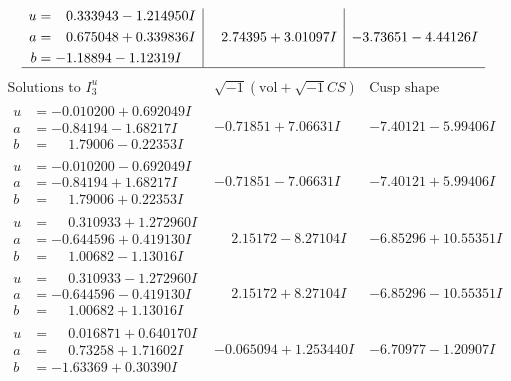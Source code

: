 \documentclass[1p]{elsarticle_modified}
\theoremstyle{definition}
\newcommand{\I}{\sqrt{-1}}
\begin{document}
$$\begin{array}{c|c|c}
\begin{aligned}
u &= \phantom{-}0.333943 - 1.214950 I \\
a &= \phantom{-}0.675048 + 0.339836 I \\
b &= -1.18894 - 1.12319 I\end{aligned}
 & \phantom{-}2.74395 + 3.01097 I & -3.73651 - 4.44126 I\\
 \hline 
 \end{array}$$\newpage$$\begin{array}{c|c|c}  
\text{Solutions to }I^u_{3}& \I (\text{vol} + \sqrt{-1}CS) & \text{Cusp shape}\\
 \hline 
\begin{aligned}
u &= -0.010200 + 0.692049 I \\
a &= -0.84194 - 1.68217 I \\
b &= \phantom{-}1.79006 - 0.22353 I\end{aligned}
 & -0.71851 + 7.06631 I & -7.40121 - 5.99406 I \\ \hline\begin{aligned}
u &= -0.010200 - 0.692049 I \\
a &= -0.84194 + 1.68217 I \\
b &= \phantom{-}1.79006 + 0.22353 I\end{aligned}
 & -0.71851 - 7.06631 I & -7.40121 + 5.99406 I \\ \hline\begin{aligned}
u &= \phantom{-}0.310933 + 1.272960 I \\
a &= -0.644596 + 0.419130 I \\
b &= \phantom{-}1.00682 - 1.13016 I\end{aligned}
 & \phantom{-}2.15172 - 8.27104 I & -6.85296 + 10.55351 I \\ \hline\begin{aligned}
u &= \phantom{-}0.310933 - 1.272960 I \\
a &= -0.644596 - 0.419130 I \\
b &= \phantom{-}1.00682 + 1.13016 I\end{aligned}
 & \phantom{-}2.15172 + 8.27104 I & -6.85296 - 10.55351 I \\ \hline\begin{aligned}
u &= \phantom{-}0.016871 + 0.640170 I \\
a &= \phantom{-}0.73258 + 1.71602 I \\
b &= -1.63369 + 0.30390 I\end{aligned}
 & -0.065094 + 1.253440 I & -6.70977 - 1.20907 I \\ \hline\begin{aligned}

\end{aligned}
\end{array}$$
\end{document}
